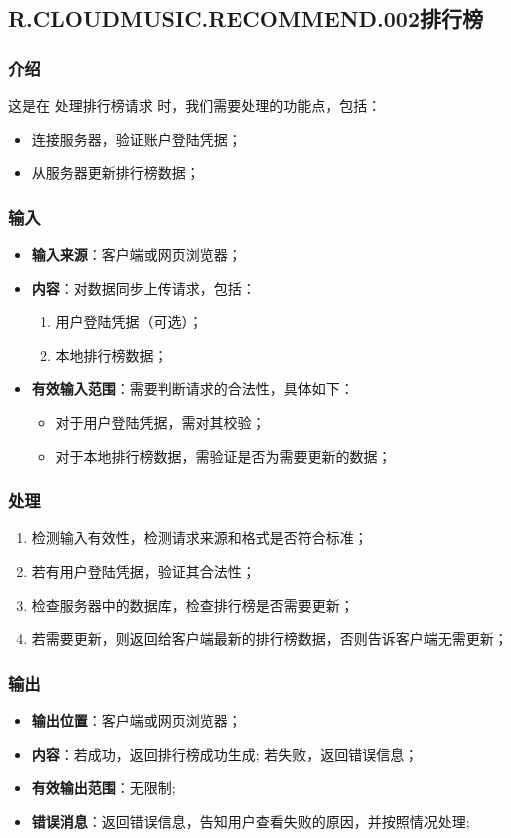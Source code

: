\subsection{R.CLOUDMUSIC.RECOMMEND.002排行榜}
\subsubsection{介绍}
	这是在 处理排行榜请求 时，我们需要处理的功能点，包括：
	\begin{itemize}
		\item 连接服务器，验证账户登陆凭据；
		\item 从服务器更新排行榜数据；
	\end{itemize}
\subsubsection{输入}
	\begin{itemize}
		\item \textbf{输入来源}：客户端或网页浏览器；
		\item \textbf{内容}：对数据同步上传请求，包括：
		\begin{enumerate}
			\item 用户登陆凭据（可选）；
			\item 本地排行榜数据；
		\end{enumerate}
		\item \textbf{有效输入范围}：需要判断请求的合法性，具体如下：
		\begin{itemize}
			\item 对于用户登陆凭据，需对其校验； 
			\item 对于本地排行榜数据，需验证是否为需要更新的数据； 
		\end{itemize}
	\end{itemize}
\subsubsection{处理}
	\begin{enumerate}
		\item 检测输入有效性，检测请求来源和格式是否符合标准；
		\item 若有用户登陆凭据，验证其合法性；
		\item 检查服务器中的数据库，检查排行榜是否需要更新；
		\item 若需要更新，则返回给客户端最新的排行榜数据，否则告诉客户端无需更新；
	\end{enumerate}
\subsubsection{输出}
\begin{itemize}
	\item \textbf{输出位置}：客户端或网页浏览器；
	\item \textbf{内容}：若成功，返回排行榜成功生成; 若失败，返回错误信息；
	\item \textbf{有效输出范围}：无限制;
	\item \textbf{错误消息}：返回错误信息，告知用户查看失败的原因，并按照情况处理;
\end{itemize}

